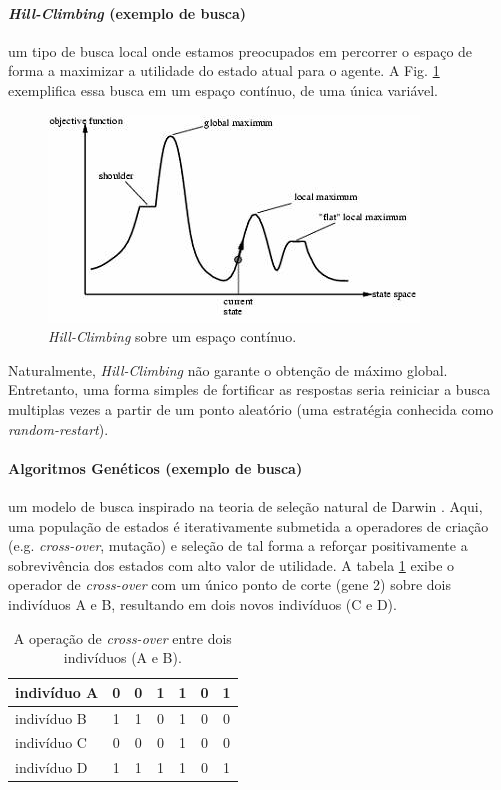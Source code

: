 \documentclass[twoside,conference,a4paper,12px]{IEEEtran}
\begin{document}
\paragraph{\textit{Hill-Climbing} (exemplo de busca)}

um tipo de busca local onde estamos preocupados em percorrer o espaço de forma a maximizar a utilidade do estado atual para o agente. A Fig. \ref{fig:search-hill-climbing} exemplifica essa busca em um espaço contínuo, de uma única variável.

\begin{figure}[!ht]
	\centering
	\includegraphics[width=.3\textwidth]{assets/search-hill-climbing}
	\caption{\textit{Hill-Climbing} sobre um espaço contínuo.}
	\label{fig:search-hill-climbing}
\end{figure}

Naturalmente, \textit{Hill-Climbing} não garante o obtenção de máximo global. Entretanto, uma forma simples de fortificar as respostas seria reiniciar a busca multiplas vezes a partir de um ponto aleatório (uma estratégia conhecida como \textit{random-restart}).

\paragraph{Algoritmos Genéticos (exemplo de busca)}

um modelo de busca inspirado na teoria de seleção natural de Darwin \cite{darwin1909origin}. Aqui, uma população de estados é iterativamente submetida a operadores de criação (e.g. \textit{cross-over}, mutação) e seleção de tal forma a reforçar positivamente a sobrevivência dos estados com alto valor de utilidade. A tabela \ref{tbl:ga} exibe o operador de \textit{cross-over} com um único ponto de corte (gene 2) sobre dois indivíduos A e B, resultando em dois novos indivíduos (C e D).

\begin{table}[!ht]
	\normalsize
	\renewcommand\tabcolsep{4.5pt}
	\renewcommand{\arraystretch}{1.2}
	\centering
	\begin{tabular}{|l|cc|cccc|}
		\hline  
		indivíduo A & 0 & 0 & 1 & 1 & 0 & 1 \\\hline
		indivíduo B & 1 & 1 & 0 & 1 & 0 & 0 \\\hline\hline
		indivíduo C & 0 & 0 & 0 & 1 & 0 & 0 \\\hline
		indivíduo D & 1 & 1 & 1 & 1 & 0 & 1 \\\hline		
	\end{tabular}
	\caption{A operação de \textit{cross-over} entre dois indivíduos (A e B).}
	\label{tbl:ga}
\end{table}
\end{document}
